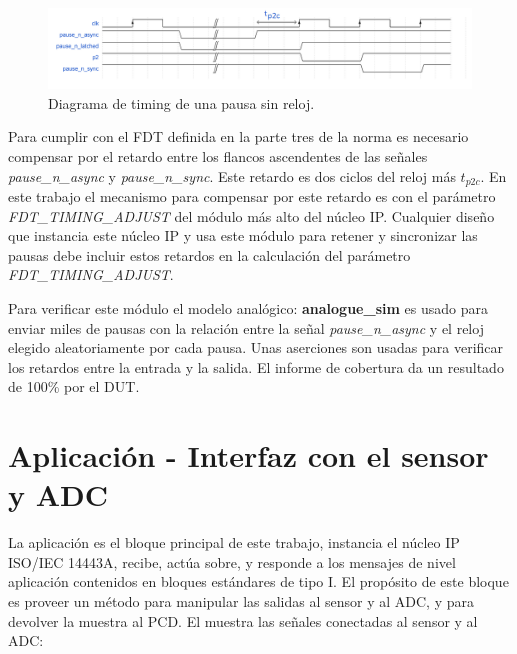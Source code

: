 \documentclass[a4paper, twoside, 11pt]{report}
\begin{document}
\begin{figure}[htb]
  \centering
  \includegraphics[width=1.0\textwidth]{./img/pause_latch_sync_dff_timing_1}
  \caption{Diagrama de timing de una pausa sin reloj.}
  \label{fig:pause_n_synch_and_latch_timing}
\end{figure}

Para cumplir con el FDT definida en la parte tres de la norma es necesario compensar por el retardo entre los flancos ascendentes de las señales \textit{pause\_n\_async} y \textit{pause\_n\_sync}. Este retardo es dos ciclos del reloj más $t_{p2c}$. En este trabajo el mecanismo para compensar por este retardo es con el parámetro \textit{FDT\_TIMING\_ADJUST} del módulo más alto del núcleo IP. Cualquier diseño que instancia este núcleo IP y usa este módulo para retener y sincronizar las pausas debe incluir estos retardos en la calculación del parámetro \textit{FDT\_TIMING\_ADJUST}.

Para verificar este módulo el modelo analógico: \textbf{analogue\_sim} es usado para enviar miles de pausas con la relación entre la señal \textit{pause\_n\_async} y el reloj elegido aleatoriamente por cada pausa. Unas aserciones son usadas para verificar los retardos entre la entrada y la salida. El informe de cobertura da un resultado de 100\% por el DUT.

\FloatBarrier
\section{Aplicación - Interfaz con el sensor y ADC}

La aplicación es el bloque principal de este trabajo, instancia el núcleo IP ISO/IEC 14443A, recibe, actúa sobre, y responde a los mensajes de nivel aplicación contenidos en bloques estándares de tipo I. El propósito de este bloque es proveer un método para manipular las salidas al sensor y al ADC, y para devolver la muestra al PCD. El  muestra las señales conectadas al sensor y al ADC:
\end{document}
